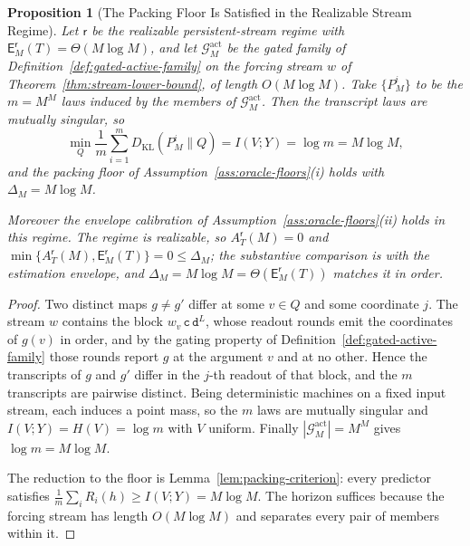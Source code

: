 \documentclass[12pt]{article}
\newtheorem{proposition}[theorem]{Proposition}
\theoremstyle{definition}
\newcommand{\Est}{\mathsf E}
\newcommand{\Aapp}{A_T}
\newcommand{\KL}{D_{\mathrm{KL}}}
\newcommand{\Gact}{\mathcal G^{\mathrm{act}}}
\begin{document}
\begin{proposition}[The Packing Floor Is Satisfied in the Realizable Stream Regime]
\label{prop:floors-instance}
Let $\mathsf r$ be the realizable persistent-stream regime with
$\Est_M^{\mathsf r}(T)=\Theta(M\log M)$, and let $\Gact_M$ be the gated family
of Definition~\ref{def:gated-active-family} on the forcing stream $w$ of
Theorem~\ref{thm:stream-lower-bound}, of length $O(M\log M)$.  Take
$\{P_M^{i}\}$ to be the $m=M^{M}$ laws induced by the members of $\Gact_M$.
Then the transcript laws are mutually singular, so
\[
\min_Q\frac1m\sum_{i=1}^{m}\KL(P_M^{i}\|Q)
=
I(V;Y)
=
\log m
=
M\log M,
\]
and the packing floor of Assumption~\ref{ass:oracle-floors}(i) holds with
$\Delta_M=M\log M$.

Moreover the envelope calibration of
Assumption~\ref{ass:oracle-floors}(ii) holds in this regime.  The regime is
realizable, so $\Aapp^{\mathsf r}(M)=0$ and
$\min\{\Aapp^{\mathsf r}(M),\Est_M^{\mathsf r}(T)\}=0\le\Delta_M$; the
substantive comparison is with the estimation envelope, and
$\Delta_M=M\log M=\Theta(\Est_M^{\mathsf r}(T))$ matches it in order.
\end{proposition}

\begin{proof}
Two distinct maps $g\ne g'$ differ at some $v\in Q$ and some coordinate $j$.
The stream $w$ contains the block $w_v\,\mathtt c\,\mathtt d^{L}$, whose
readout rounds emit the coordinates of $g(v)$ in order, and by the gating
property of Definition~\ref{def:gated-active-family} those rounds report $g$ at
the argument $v$ and at no other.  Hence the transcripts of $g$ and $g'$ differ
in the $j$-th readout of that block, and the $m$ transcripts are pairwise
distinct.  Being deterministic machines on a fixed input stream, each induces a
point mass, so the $m$ laws are mutually singular and
$I(V;Y)=H(V)=\log m$ with $V$ uniform.  Finally $|\Gact_M|=M^{M}$ gives
$\log m=M\log M$.

The reduction to the floor is Lemma~\ref{lem:packing-criterion}: every
predictor satisfies $\frac1m\sum_iR_i(h)\ge I(V;Y)=M\log M$.  The horizon
suffices because the forcing stream has length $O(M\log M)$ and separates every
pair of members within it.
\end{proof}
\end{document}
